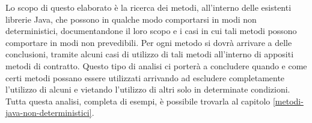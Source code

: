 Lo scopo di questo elaborato è la ricerca dei metodi, all'interno delle esistenti librerie Java, che possono in qualche modo comportarsi in modi non deterministici, documentandone il loro scopo e i casi in cui tali metodi possono comportare in modi non prevedibili. Per ogni metodo si dovrà arrivare a delle conclusioni, tramite alcuni casi di utilizzo di tali metodi all'interno di appositi metodi di contratto. Questo tipo di analisi ci porterà a concludere quando e come certi metodi possano essere utilizzati arrivando ad escludere completamente l'utilizzo di alcuni e vietando l'utilizzo di altri solo in determinate condizioni. Tutta questa analisi, completa di esempi, è possibile trovarla al capitolo \ref{metodi-java-non-deterministici}.